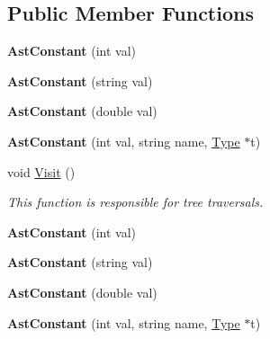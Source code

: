 \subsection*{Public Member Functions}
\begin{DoxyCompactItemize}
\item 
\hypertarget{classAstConstant_ab3d7bb141b6d2650498569fa7742237f}{{\bfseries Ast\-Constant} (int val)}\label{classAstConstant_ab3d7bb141b6d2650498569fa7742237f}

\item 
\hypertarget{classAstConstant_a071adbaa9ea9ad30cde38d68b4182cd9}{{\bfseries Ast\-Constant} (string val)}\label{classAstConstant_a071adbaa9ea9ad30cde38d68b4182cd9}

\item 
\hypertarget{classAstConstant_aef9142c2750c7ad8e83183c7b8ade0e8}{{\bfseries Ast\-Constant} (double val)}\label{classAstConstant_aef9142c2750c7ad8e83183c7b8ade0e8}

\item 
\hypertarget{classAstConstant_a9ceaff3b1de813268a88d7fded0aeb0c}{{\bfseries Ast\-Constant} (int val, string name, \hyperlink{classType}{Type} $\ast$t)}\label{classAstConstant_a9ceaff3b1de813268a88d7fded0aeb0c}

\item 
void \hyperlink{classAstConstant_ac13b7246f9d646a5ff00efee4c39bc6b}{Visit} ()
\begin{DoxyCompactList}\small\item\em This function is responsible for tree traversals. \end{DoxyCompactList}\item 
\hypertarget{classAstConstant_ab3d7bb141b6d2650498569fa7742237f}{{\bfseries Ast\-Constant} (int val)}\label{classAstConstant_ab3d7bb141b6d2650498569fa7742237f}

\item 
\hypertarget{classAstConstant_a071adbaa9ea9ad30cde38d68b4182cd9}{{\bfseries Ast\-Constant} (string val)}\label{classAstConstant_a071adbaa9ea9ad30cde38d68b4182cd9}

\item 
\hypertarget{classAstConstant_aef9142c2750c7ad8e83183c7b8ade0e8}{{\bfseries Ast\-Constant} (double val)}\label{classAstConstant_aef9142c2750c7ad8e83183c7b8ade0e8}

\item 
\hypertarget{classAstConstant_a9ceaff3b1de813268a88d7fded0aeb0c}{{\bfseries Ast\-Constant} (int val, string name, \hyperlink{classType}{Type} $\ast$t)}\label{classAstConstant_a9ceaff3b1de813268a88d7fded0aeb0c}


\end{DoxyCompactItemize}

